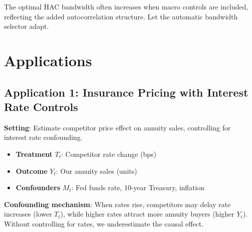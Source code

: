\begin{remark}
The optimal HAC bandwidth often increases when macro controls are included, reflecting the added autocorrelation structure. Let the automatic bandwidth selector adapt.
\end{remark}

\section{Applications}\label{sec:ch07_applications}

\subsection{Application 1: Insurance Pricing with Interest Rate Controls}

\textbf{Setting}: Estimate competitor price effect on annuity sales, controlling for interest rate confounding.

\begin{itemize}
    \item \textbf{Treatment} $T_t$: Competitor rate change (bps)
    \item \textbf{Outcome} $Y_t$: Our annuity sales (units)
    \item \textbf{Confounders} $M_t$: Fed funds rate, 10-year Treasury, inflation
\end{itemize}

\textbf{Confounding mechanism}: When rates rise, competitors may delay rate increases (lower $T_t$), while higher rates attract more annuity buyers (higher $Y_t$). Without controlling for rates, we underestimate the causal effect.

